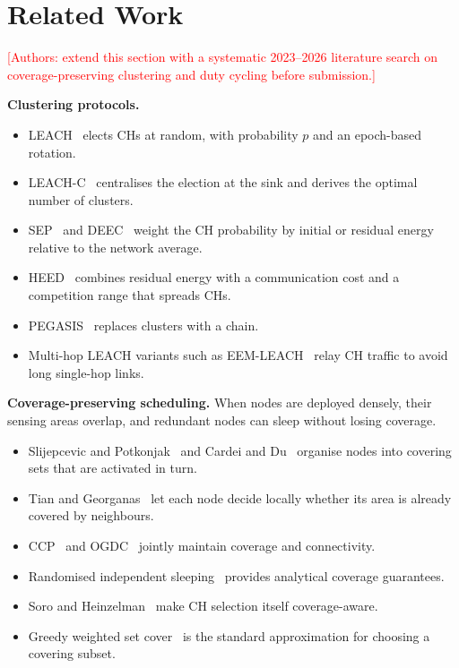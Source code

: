 \documentclass[journal]{IEEEtran}
\newcommand{\todo}[1]{\textcolor{red}{[#1]}}
\begin{document}
\section{Related Work}\label{sec:related}
\todo{Authors: extend this section with a systematic 2023--2026 literature search on coverage-preserving clustering and duty cycling before submission.}

\textbf{Clustering protocols.}
\begin{itemize}
\item LEACH~\cite{heinzelman2000leach} elects CHs at random, with probability $p$ and an epoch-based rotation.
\item LEACH-C~\cite{heinzelman2002leachc} centralises the election at the sink and derives the optimal number of clusters.
\item SEP~\cite{smaragdakis2004sep} and DEEC~\cite{qing2006deec} weight the CH probability by initial or residual energy relative to the network average.
\item HEED~\cite{younis2004heed} combines residual energy with a communication cost and a competition range that spreads CHs.
\item PEGASIS~\cite{lindsey2002pegasis} replaces clusters with a chain.
\item Multi-hop LEACH variants such as EEM-LEACH~\cite{antoo2014eemleach} relay CH traffic to avoid long single-hop links.
\end{itemize}

\textbf{Coverage-preserving scheduling.} When nodes are deployed densely, their sensing areas overlap, and redundant nodes can sleep without losing coverage.
\begin{itemize}
\item Slijepcevic and Potkonjak~\cite{slijepcevic2001power} and Cardei and Du~\cite{cardei2005setcover} organise nodes into covering sets that are activated in turn.
\item Tian and Georganas~\cite{tian2002coverage} let each node decide locally whether its area is already covered by neighbours.
\item CCP~\cite{wang2003ccp} and OGDC~\cite{zhang2005ogdc} jointly maintain coverage and connectivity.
\item Randomised independent sleeping~\cite{kumar2004kcoverage} provides analytical coverage guarantees.
\item Soro and Heinzelman~\cite{soro2009coverage} make CH selection itself coverage-aware.
\item Greedy weighted set cover~\cite{chvatal1979greedy} is the standard approximation for choosing a covering subset.
\end{itemize}
\end{document}
